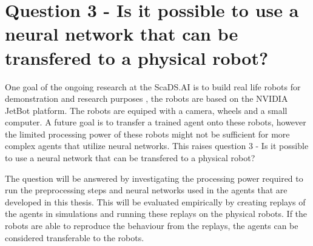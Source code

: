 \section{Question 3 - Is it possible to use a neural network that can be transfered to a physical robot?}

One goal of the ongoing research at the ScaDS.AI is to build real life robots for demonstration and research purposes \autocite{merlin_flach}, the robots are based on the NVIDIA JetBot platform. The robots are equiped with a camera, wheels and a small computer. A future goal is to transfer a trained agent onto these robots, however the limited processing power of these robots might not be sufficient for more complex agents that utilize neural networks. This raises question 3 - Is it possible to use a neural network that can be transfered to a physical robot?


The question will be answered by investigating the processing power required to run the preprocessing steps and neural networks used in the agents that are developed in this thesis. This will be evaluated empirically by creating replays of the agents in simulations and running these replays on the physical robots. If the robots are able to reproduce the behaviour from the replays, the agents can be considered transferable to the robots.

